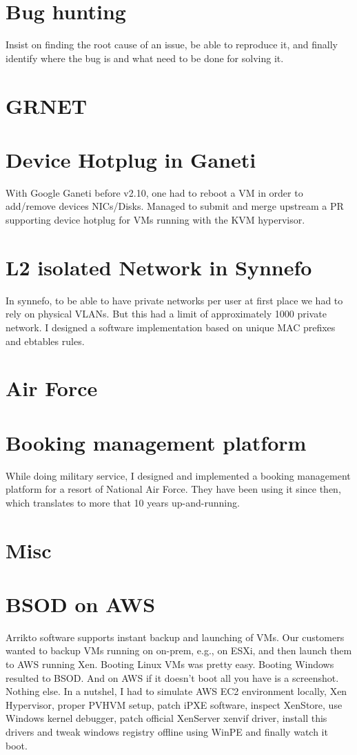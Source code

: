 \documentclass[margin,centered]{res}
\begin{document}
\begin{resume}
\section{\sc Bug hunting}
Insist on finding the root cause of an issue, be able to reproduce it, and
finally identify where the bug is and what need to be done for solving it.


\section{GRNET}

\section{\sc Device Hotplug in Ganeti}
With Google Ganeti before v2.10, one had to reboot a VM in order to add/remove
devices NICs/Disks. Managed to submit and merge upstream a PR supporting
device hotplug for VMs running with the KVM hypervisor.

\section{\sc L2 isolated Network in Synnefo}
In synnefo, to be able to have private networks per user at first place we
had to rely on physical VLANs. But this had a limit of approximately 1000
private network. I designed a software implementation based on unique MAC
prefixes and ebtables rules.

\section{Air Force}

\section{\sc Booking management platform}
While doing military service, I designed and implemented a booking management
platform for a resort of National Air Force. They have been using it
since then, which translates to more that 10 years up-and-running.

\section{Misc}

\section{\sc BSOD on AWS}
Arrikto software supports instant backup and launching of VMs. Our customers
wanted to backup VMs running on on-prem, e.g., on ESXi, and then launch them to
AWS running Xen. Booting Linux VMs was pretty easy. Booting Windows resulted to
BSOD. And on AWS if it doesn't boot all you have is a screenshot. Nothing else.
In a nutshel, I had to simulate AWS EC2 environment locally, Xen Hypervisor,
proper PVHVM setup, patch iPXE software, inspect XenStore, use Windows kernel
debugger, patch official XenServer xenvif driver, install this drivers and
tweak windows registry offline using WinPE and finally watch it boot.


\end{resume}
\end{document}
